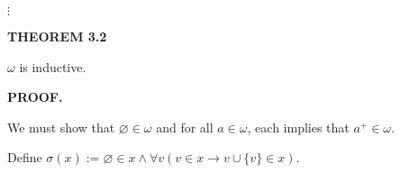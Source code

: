 \documentclass[12pt, a4paper]{article}
\begin{document}
\vspace{2mm}

\hspace{65mm}$\vdots$

\vspace{4mm}

\noindent\blacksquare\textbf{ THEOREM 3.2}\par

\vspace{4mm}

$\omega$ is inductive.

\vspace{4mm}

\noindent\textbf{PROOF.}\par

\vspace{4mm}

We must show that $\varnothing\in\omega$ and for all $a\in\omega$, each implies that $a^+\in\omega$.

\newpage


\noindent Define $\sigma(x):=\varnothing\in x\wedge\forall v(v\in x\rightarrow v\cup\{v\}\in x)$.
\end{document}
